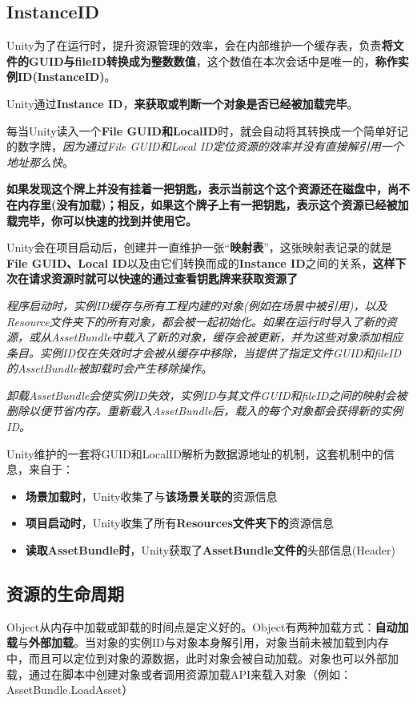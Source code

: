 \documentclass[UTF8,a4paper,12pt]{ctexbook}
\begin{document}
		\subsection{InstanceID}
			 Unity为了在运行时，提升资源管理的效率，会在内部维护一个缓存表，负责\textbf{将文件的GUID与fileID转换成为整数数值}，这个数值在本次会话中是唯一的，\textbf{称作实例ID(InstanceID)}。
				
			 Unity通过\textbf{Instance ID}，\textbf{来获取或判断一个对象是否已经被加载完毕}。
			
			 每当Unity读入一个\textbf{File GUID和LocalID}时，就会自动将其转换成一个简单好记的数字牌，\textit{因为通过File GUID和Local ID定位资源的效率并没有直接解引用一个地址那么快}。
			 
			 \color{blue}\textbf{如果发现这个牌上并没有挂着一把钥匙，表示当前这个这个资源还在磁盘中，尚不在内存里(没有加载)；相反，如果这个牌子上有一把钥匙，表示这个资源已经被加载完毕，你可以快速的找到并使用它。}\color{black}
			 
			 Unity会在项目启动后，创建并一直维护一张“\textbf{映射表}”，这张映射表记录的就是\textbf{File GUID、Local ID}以及由它们转换而成的\textbf{Instance ID}之间的关系，\textbf{这样下次在请求资源时就可以快速的通过查看钥匙牌来获取资源了}
			 
			 \textit{程序启动时，实例ID缓存与所有工程内建的对象(例如在场景中被引用)，以及Resource文件夹下的所有对象，都会被一起初始化。如果在运行时导入了新的资源，或从AssetBundle中载入了新的对象，缓存会被更新，并为这些对象添加相应条目。实例ID仅在失效时才会被从缓存中移除，当提供了指定文件GUID和fileID的AssetBundle被卸载时会产生移除操作}。
					
			 \textit{卸载AssetBundle会使实例ID失效，实例ID与其文件GUID和fileID之间的映射会被删除以便节省内存。重新载入AssetBundle后，载入的每个对象都会获得新的实例ID。}
			 
			 Unity维护的一套将GUID和LocalID解析为数据源地址的机制，这套机制中的信息，来自于：
			 	\begin{itemize}
			 		\item \textbf{场景加载时}，Unity收集了与\textbf{该场景关联的}资源信息
			 		\item \textbf{项目启动时}，Unity收集了所有\textbf{Resources文件夹下的}资源信息
			 		\item \textbf{读取AssetBundle时}，Unity获取了\textbf{AssetBundle文件的}头部信息(Header)
			 	\end{itemize}
			 	
		\subsection{资源的生命周期}
			Object从内存中加载或卸载的时间点是定义好的。Object有两种加载方式：\textbf{自动加载}与\textbf{外部加载}。当对象的实例ID与对象本身解引用，对象当前未被加载到内存中，而且可以定位到对象的源数据，此时对象会被自动加载。对象也可以外部加载，通过在脚本中创建对象或者调用资源加载API来载入对象（例如：AssetBundle.LoadAsset） 
			
\end{document}
